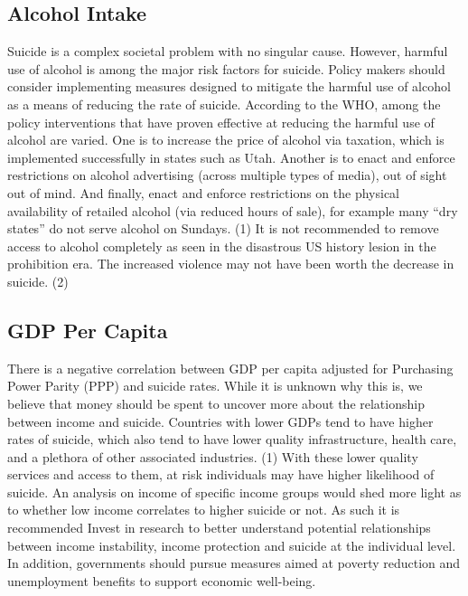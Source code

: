 \documentclass[]{article}
\begin{document}
\subsection{Alcohol Intake}\label{alcohol-intake}

Suicide is a complex societal problem with no singular cause. However,
harmful use of alcohol is among the major risk factors for suicide.
Policy makers should consider implementing measures designed to mitigate
the harmful use of alcohol as a means of reducing the rate of suicide.
According to the WHO, among the policy interventions that have proven
effective at reducing the harmful use of alcohol are varied. One is to
increase the price of alcohol via taxation, which is implemented
successfully in states such as Utah. Another is to enact and enforce
restrictions on alcohol advertising (across multiple types of media),
out of sight out of mind. And finally, enact and enforce restrictions on
the physical availability of retailed alcohol (via reduced hours of
sale), for example many ``dry states'' do not serve alcohol on Sundays.
(1) It is not recommended to remove access to alcohol completely as seen
in the disastrous US history lesion in the prohibition era. The
increased violence may not have been worth the decrease in suicide. (2)

\subsection{GDP Per Capita}\label{gdp-per-capita}

There is a negative correlation between GDP per capita adjusted for
Purchasing Power Parity (PPP) and suicide rates. While it is unknown why
this is, we believe that money should be spent to uncover more about the
relationship between income and suicide. Countries with lower GDPs tend
to have higher rates of suicide, which also tend to have lower quality
infrastructure, health care, and a plethora of other associated
industries. (1) With these lower quality services and access to them, at
risk individuals may have higher likelihood of suicide. An analysis on
income of specific income groups would shed more light as to whether low
income correlates to higher suicide or not. As such it is recommended
Invest in research to better understand potential relationships between
income instability, income protection and suicide at the individual
level. In addition, governments should pursue measures aimed at poverty
reduction and unemployment benefits to support economic well-being.
\end{document}
